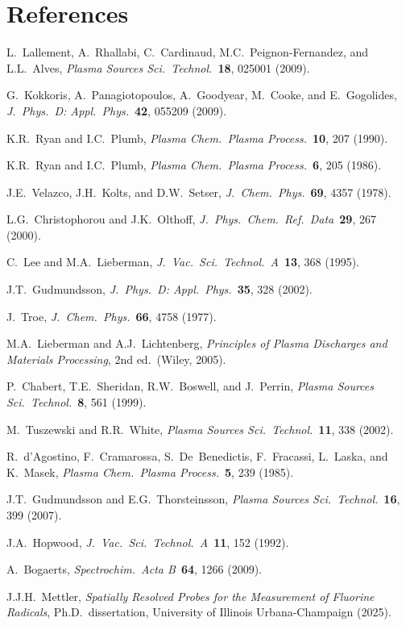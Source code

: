 \documentclass[11pt,a4paper]{article}
\begin{document}
\section*{References}

\begin{enumerate}[label={[\arabic*]}]
\item L.\ Lallement, A.\ Rhallabi, C.\ Cardinaud, M.C.\ Peignon-Fernandez, and L.L.\ Alves, \textit{Plasma Sources Sci.\ Technol.}\ \textbf{18}, 025001 (2009).
\item G.\ Kokkoris, A.\ Panagiotopoulos, A.\ Goodyear, M.\ Cooke, and E.\ Gogolides, \textit{J.\ Phys.\ D: Appl.\ Phys.}\ \textbf{42}, 055209 (2009).
\item K.R.\ Ryan and I.C.\ Plumb, \textit{Plasma Chem.\ Plasma Process.}\ \textbf{10}, 207 (1990).
\item K.R.\ Ryan and I.C.\ Plumb, \textit{Plasma Chem.\ Plasma Process.}\ \textbf{6}, 205 (1986).
\item J.E.\ Velazco, J.H.\ Kolts, and D.W.\ Setser, \textit{J.\ Chem.\ Phys.}\ \textbf{69}, 4357 (1978).
\item L.G.\ Christophorou and J.K.\ Olthoff, \textit{J.\ Phys.\ Chem.\ Ref.\ Data}\ \textbf{29}, 267 (2000).
\item C.\ Lee and M.A.\ Lieberman, \textit{J.\ Vac.\ Sci.\ Technol.\ A}\ \textbf{13}, 368 (1995).
\item J.T.\ Gudmundsson, \textit{J.\ Phys.\ D: Appl.\ Phys.}\ \textbf{35}, 328 (2002).
\item J.\ Troe, \textit{J.\ Chem.\ Phys.}\ \textbf{66}, 4758 (1977).
\item M.A.\ Lieberman and A.J.\ Lichtenberg, \textit{Principles of Plasma Discharges and Materials Processing}, 2nd ed.\ (Wiley, 2005).
\item P.\ Chabert, T.E.\ Sheridan, R.W.\ Boswell, and J.\ Perrin, \textit{Plasma Sources Sci.\ Technol.}\ \textbf{8}, 561 (1999).
\item M.\ Tuszewski and R.R.\ White, \textit{Plasma Sources Sci.\ Technol.}\ \textbf{11}, 338 (2002).
\item R.\ d'Agostino, F.\ Cramarossa, S.\ De~Benedictis, F.\ Fracassi, L.\ Laska, and K.\ Masek, \textit{Plasma Chem.\ Plasma Process.}\ \textbf{5}, 239 (1985).
\item J.T.\ Gudmundsson and E.G.\ Thorsteinsson, \textit{Plasma Sources Sci.\ Technol.}\ \textbf{16}, 399 (2007).
\item J.A.\ Hopwood, \textit{J.\ Vac.\ Sci.\ Technol.\ A}\ \textbf{11}, 152 (1992).
\item A.\ Bogaerts, \textit{Spectrochim.\ Acta B}\ \textbf{64}, 1266 (2009).
\item J.J.H.\ Mettler, \textit{Spatially Resolved Probes for the Measurement of Fluorine Radicals}, Ph.D.\ dissertation, University of Illinois Urbana-Champaign (2025).
\end{enumerate}
\end{document}
